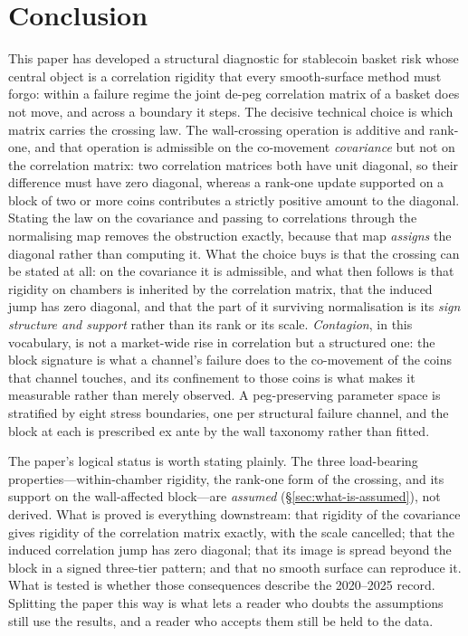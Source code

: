 
\section{Conclusion}\label{sec:conclusion}
This paper has developed a structural diagnostic for stablecoin basket risk whose central object is a correlation rigidity that every smooth-surface method must forgo: within a failure regime the joint de-peg correlation matrix of a basket does not move, and across a boundary it steps. The decisive technical choice is which matrix carries the crossing law. The wall-crossing operation is additive and rank-one, and that operation is admissible on the co-movement \emph{covariance} but not on the correlation matrix: two correlation matrices both have unit diagonal, so their difference must have zero diagonal, whereas a rank-one update supported on a block of two or more coins contributes a strictly positive amount to the diagonal. Stating the law on the covariance and passing to correlations through the normalising map removes the obstruction exactly, because that map \emph{assigns} the diagonal rather than computing it. What the choice buys is that the crossing can be stated at all: on the covariance it is admissible, and what then follows is that rigidity on chambers is inherited by the correlation matrix, that the induced jump has zero diagonal, and that the part of it surviving normalisation is its \emph{sign structure and support} rather than its rank or its scale. \emph{Contagion}, in this vocabulary, is not a market-wide rise in correlation but a structured one: the block signature is what a channel's failure does to the co-movement of the coins that channel touches, and its confinement to those coins is what makes it measurable rather than merely observed. A peg-preserving parameter space is stratified by eight stress boundaries, one per structural failure channel, and the block at each is prescribed ex ante by the wall taxonomy rather than fitted.

The paper's logical status is worth stating plainly. The three load-bearing properties---within-chamber rigidity, the rank-one form of the crossing, and its support on the wall-affected block---are \emph{assumed} (\S\ref{sec:what-is-assumed}), not derived. What is proved is everything downstream: that rigidity of the covariance gives rigidity of the correlation matrix exactly, with the scale cancelled; that the induced correlation jump has zero diagonal; that its image is spread beyond the block in a signed three-tier pattern; and that no smooth surface can reproduce it. What is tested is whether those consequences describe the 2020--2025 record. Splitting the paper this way is what lets a reader who doubts the assumptions still use the results, and a reader who accepts them still be held to the data.

